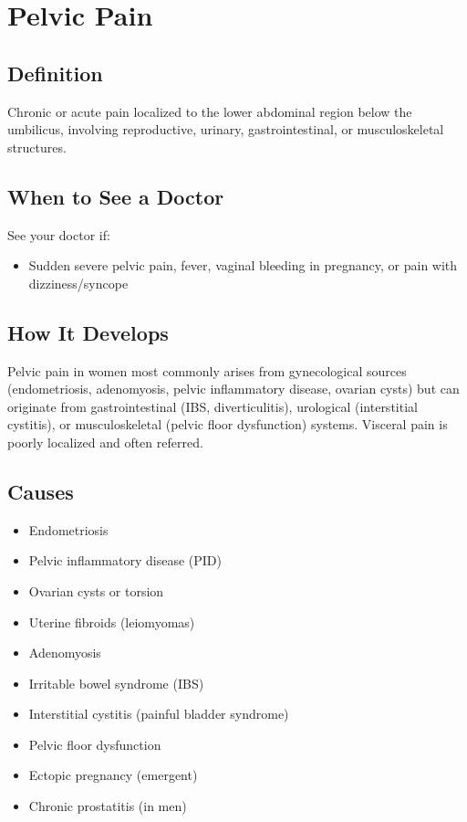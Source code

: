 \chapter{Pelvic Pain}

\section*{Definition}
Chronic or acute pain localized to the lower abdominal region below the umbilicus, involving reproductive, urinary, gastrointestinal, or musculoskeletal structures.

\section*{When to See a Doctor}
See your doctor if:
\begin{itemize}
  \item Sudden severe pelvic pain, fever, vaginal bleeding in pregnancy, or pain with dizziness/syncope
\end{itemize}

\section*{How It Develops}
Pelvic pain in women most commonly arises from gynecological sources (endometriosis, adenomyosis, pelvic inflammatory disease, ovarian cysts) but can originate from gastrointestinal (IBS, diverticulitis), urological (interstitial cystitis), or musculoskeletal (pelvic floor dysfunction) systems. Visceral pain is poorly localized and often referred.

\section*{Causes}
\begin{itemize}
  \item Endometriosis
  \item Pelvic inflammatory disease (PID)
  \item Ovarian cysts or torsion
  \item Uterine fibroids (leiomyomas)
  \item Adenomyosis
  \item Irritable bowel syndrome (IBS)
  \item Interstitial cystitis (painful bladder syndrome)
  \item Pelvic floor dysfunction
  \item Ectopic pregnancy (emergent)
  \item Chronic prostatitis (in men)
\end{itemize}

